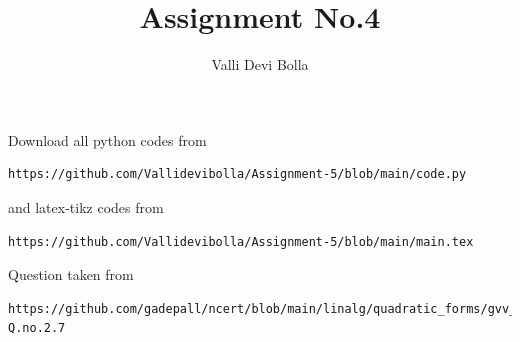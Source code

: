 \documentclass[journal,12pt,twocolumn]{IEEEtran}
\begin{document}
\def\rightbox#1{\makebox[0in][r]{#1}}
\def\centbox#1{\makebox[0in]{#1}}
\def\topbox#1{\raisebox{-\baselineskip}[0in][0in]{#1}}
\def\midbox#1{\raisebox{-0.5\baselineskip}[0in][0in]{#1}}
\vspace{3cm}
\title{Assignment No.4}
\author{Valli Devi Bolla}
\maketitle
\newpage
\bigskip
\renewcommand{\thefigure}{\theenumi}
\renewcommand{\thetable}{\theenumi}
Download all python codes from
\begin{lstlisting}
https://github.com/Vallidevibolla/Assignment-5/blob/main/code.py
\end{lstlisting}
%
and latex-tikz codes from
%
\begin{lstlisting}
https://github.com/Vallidevibolla/Assignment-5/blob/main/main.tex
\end{lstlisting}
%
Question taken from
\begin{lstlisting}
https://github.com/gadepall/ncert/blob/main/linalg/quadratic_forms/gvv_ncert_quadratic_forms.pdf-Q.no.2.7
\end{lstlisting}
%
\end{document}
